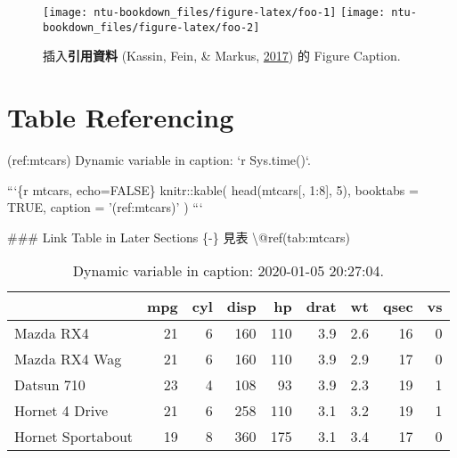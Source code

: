 \documentclass[oneside]{book}
\newenvironment{Shaded}{\begin{snugshade}}{\end{snugshade}}
\newcommand{\BaseNTok}[1]{\textcolor[rgb]{0.00,0.00,0.81}{#1}}
\newcommand{\FunctionTok}[1]{\textcolor[rgb]{0.00,0.00,0.00}{#1}}
\newcommand{\NormalTok}[1]{#1}
\theoremstyle{definition}
\theoremstyle{definition}
\theoremstyle{definition}
\theoremstyle{remark}
\begin{document}
\begin{figure}

{\centering \texttt{[image: ntu-bookdown\_files/figure-latex/foo-1]} \texttt{[image: ntu-bookdown\_files/figure-latex/foo-2]} 

}

\caption{插入\textbf{引用資料} (Kassin, Fein, \& Markus, \protect\hyperlink{ref-kassin2017}{2017}) 的 Figure Caption.}\label{fig:foo}
\end{figure}

\hypertarget{table-referencing}{%
\section{Table Referencing}\label{table-referencing}}

\begin{Shaded}
\begin{Highlighting}[]
\NormalTok{(ref:mtcars) Dynamic variable in caption: }\BaseNTok{`r Sys.time()`}\NormalTok{.}

\BaseNTok{```\{r mtcars, echo=FALSE\}}
\BaseNTok{knitr::kable(}
\BaseNTok{  head(mtcars[, 1:8], 5), booktabs = TRUE,}
\BaseNTok{  caption = '(ref:mtcars)'}
\BaseNTok{  )}
\BaseNTok{```}

\FunctionTok{### Link Table in Later Sections \{-\}}
\NormalTok{見表 \textbackslash{}@ref(tab:mtcars)}
\end{Highlighting}
\end{Shaded}



\begin{table}

\caption{\label{tab:mtcar}Dynamic variable in caption: 2020-01-05 20:27:04.}
\centering
\begin{tabular}[t]{lrrrrrrrr}
\toprule
  & mpg & cyl & disp & hp & drat & wt & qsec & vs\\
\midrule
Mazda RX4 & 21 & 6 & 160 & 110 & 3.9 & 2.6 & 16 & 0\\
Mazda RX4 Wag & 21 & 6 & 160 & 110 & 3.9 & 2.9 & 17 & 0\\
Datsun 710 & 23 & 4 & 108 & 93 & 3.9 & 2.3 & 19 & 1\\
Hornet 4 Drive & 21 & 6 & 258 & 110 & 3.1 & 3.2 & 19 & 1\\
Hornet Sportabout & 19 & 8 & 360 & 175 & 3.1 & 3.4 & 17 & 0\\
\bottomrule
\end{tabular}
\end{table}
\end{document}
